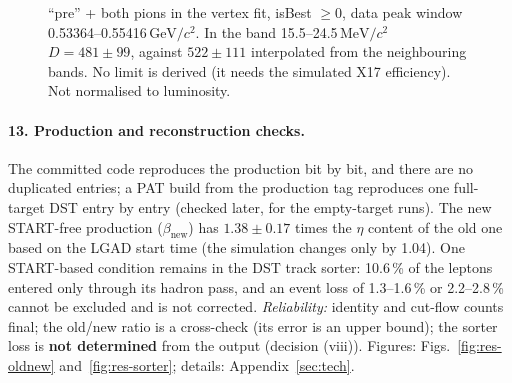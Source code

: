 \documentclass[11pt,a4paper]{article}
\newcommand{\betanew}{\ensuremath{\beta_{\mathrm{new}}}\xspace}
\newcommand{\GeVcc}{\ensuremath{\mathrm{GeV}/c^{2}}\xspace}
\newcommand{\MeVcc}{\ensuremath{\mathrm{MeV}/c^{2}}\xspace}
\begin{document}
\begin{figure}[!tbp]
\begin{minipage}[t]{0.485\textwidth}
{``pre'' + both pions in the vertex fit, isBest $\ge0$, data peak window 0.53364--0.55416\,\GeVcc. In the band 15.5--24.5\,\MeVcc
$D=481\pm99$, against $522\pm111$ interpolated from the neighbouring bands. No limit is derived (it needs the simulated X17 efficiency).
Not normalised to luminosity.}
\label{fig:res-x17}
\end{minipage}
\end{figure}

\paragraph{13. Production and reconstruction checks.} The committed code reproduces the production bit by bit, and there are no
duplicated entries; a PAT build from the production tag reproduces one full-target DST entry by entry (checked later, for the empty-target runs). The new START-free production ($\betanew$) has $1.38\pm0.17$ times the $\eta$ content of the old one based on the
LGAD start time (the simulation changes only by 1.04). One START-based condition remains in the DST track sorter: 10.6\,\% of the
leptons entered only through its hadron pass, and an event loss of 1.3--1.6\,\% or 2.2--2.8\,\% cannot be excluded and is not
corrected. \emph{Reliability:} identity and cut-flow counts final; the old/new ratio is a cross-check (its error is an upper bound); the
sorter loss is \textbf{not determined} from the output (decision (viii)). Figures: Figs.~\ref{fig:res-oldnew} and~\ref{fig:res-sorter};
details: Appendix~\ref{sec:tech}.
\end{document}
